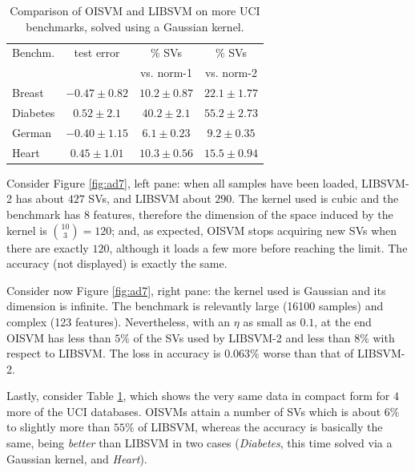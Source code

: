 \begin{table}
\begin{center}
\begin{tabular}[!h]{|l|c|c|c|}
\hline
   Benchm. & test error     & \% SVs          & \% SVs        \\
           &                & vs. norm-1      & vs. norm-2    \\ \hline
    Breast & $-0.47\pm0.82$ & $10.2\pm0.87$   & $22.1\pm1.77$ \\
  Diabetes & $0.52\pm2.1$   & $40.2\pm2.1$    & $55.2\pm2.73$ \\
  German   & $-0.40\pm1.15$ & $6.1\pm0.23$    & $9.2\pm0.35$  \\
  Heart    & $0.45\pm1.01$  & $10.3\pm0.56$   & $15.5\pm0.94$ \\ \hline
\end{tabular}
\end{center}
\label{table:t1}
\caption{Comparison of OISVM and LIBSVM on more UCI benchmarks, solved
 using a Gaussian kernel.}
\end{table}

Consider Figure \ref{fig:ad7}, left pane: when all samples have been
loaded, LIBSVM-2 has about $427$ SVs, and LIBSVM about $290$. The
kernel used is cubic and the benchmark has $8$ features, therefore the
dimension of the space induced by the kernel is $\binom{10}{3} = 120$;
and, as expected, OISVM stops acquiring new SVs when there are exactly
$120$, although it loads a few more before reaching the limit. The
accuracy (not displayed) is exactly the same.

Consider now Figure \ref{fig:ad7}, right pane: the kernel used is
Gaussian and its dimension is infinite. The benchmark is relevantly
large (16100 samples) and complex (123 features). Nevertheless, with
an $\eta$ as small as $0.1$, at the end OISVM has less than $5\%$ of
the SVs used by LIBSVM-2 and less than $8\%$ with respect to
LIBSVM. The loss in accuracy is $0.063\%$ worse than that of LIBSVM-2.

Lastly, consider Table \ref{table:t1}, which shows the very same data
in compact form for $4$ more of the UCI databases. OISVMs attain a
number of SVs which is about $6\%$ to slightly more than $55\%$ of
LIBSVM, whereas the accuracy is basically the same, being
\emph{better} than LIBSVM in two cases (\emph{Diabetes}, this time
solved via a Gaussian kernel, and
\emph{Heart}).
